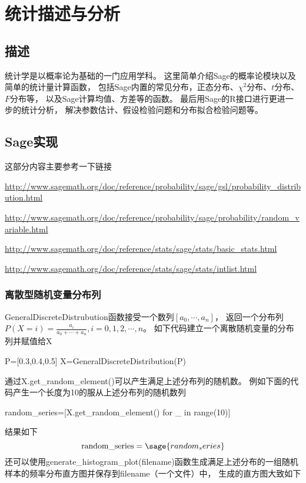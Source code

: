 \section{统计描述与分析}
\subsection{描述}
统计学是以概率论为基础的一门应用学科。
这里简单介绍Sage的概率论模块以及简单的统计量计算函数，
包括Sage内置的常见分布，正态分布、$\chi^2$分布、$t$分布、$F$分布等，
以及Sage计算均值、方差等的函数。
最后用Sage的R接口进行更进一步的统计分析，
解决参数估计、假设检验问题和分布拟合检验问题等。

\subsection{Sage实现}
这部分内容主要参考一下链接

\href{http://www.sagemath.org/doc/reference/probability/sage/gsl/probability\_distribution.html}{http://www.sagemath.org/doc/reference/probability/sage/gsl/probability\_distribution.html}

\href{http://www.sagemath.org/doc/reference/probability/sage/probability/random\_variable.html}{http://www.sagemath.org/doc/reference/probability/sage/probability/random\_variable.html}

\href{http://www.sagemath.org/doc/reference/stats/sage/stats/basic\_stats.html}{http://www.sagemath.org/doc/reference/stats/sage/stats/basic\_stats.html}

\href{http://www.sagemath.org/doc/reference/stats/sage/stats/intlist.html}{http://www.sagemath.org/doc/reference/stats/sage/stats/intlist.html}

\subsubsection{离散型随机变量分布列}
GeneralDiscreteDistrubution函数接受一个数列$[a_0,\cdots,a_n]$，
返回一个分布列$P(X=i)=\frac{a_i}{a_0+\cdots+a_n},i=0,1,2,\cdots,n$。
如下代码建立一个离散随机变量的分布列并赋值给X
\begin{sageblock}
P=[0.3,0.4,0.5]
X=GeneralDiscreteDistribution(P)
\end{sageblock}
通过X.get\_random\_element()可以产生满足上述分布列的随机数。
例如下面的代码产生一个长度为10的服从上述分布列的随机数列
\begin{sageblock}
random_series=[X.get_random_element() for _ in range(10)]
\end{sageblock}
结果如下
\[\textrm{random\_series}=\sage{random_series}\]
还可以使用generate\_histogram\_plot(filename)函数生成满足上述分布的一组随机样本的频率分布直方图并保存到filename（一个文件）中，
生成的直方图大致如下

